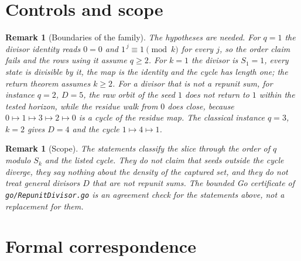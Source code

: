 \documentclass[11pt,letterpaper]{article}
\newtheorem{remark}[theorem]{Remark}
\begin{document}
\section{Controls and scope}

\begin{remark}[Boundaries of the family]\label{Rem:Controls}
The hypotheses are needed. For \(q=1\) the divisor identity reads
\(0=0\) and \(1^{\,j}\equiv1\pmod{k}\) for every \(j\), so the order claim
fails and the rows using it assume \(q\ge2\). For \(k=1\) the divisor is
\(S_1=1\), every state is divisible by it, the map is the identity and the
cycle has length one; the return theorem assumes \(k\ge2\). For a divisor that
is not a repunit sum, for instance \(q=2\), \(D=5\), the raw orbit of the seed
\(1\) does not return to \(1\) within the tested horizon, while the residue
walk from \(0\) does close, because \(0\mapsto1\mapsto3\mapsto2\mapsto0\) is a
cycle of the residue map. The classical instance
\(q=3\), \(k=2\) gives \(D=4\) and the cycle \(1\mapsto4\mapsto1\).
\end{remark}

\begin{remark}[Scope]\label{Rem:Scope}
The statements classify the slice through the order of \(q\) modulo \(S_k\)
and the listed cycle. They do not claim that seeds outside the cycle diverge,
they say nothing about the density of the captured set, and they do not treat
general divisors \(D\) that are not repunit sums. The bounded Go certificate
of \texttt{go/RepunitDivisor.go} is an agreement check for the statements
above, not a replacement for them.
\end{remark}

\section{Formal correspondence}
\end{document}
